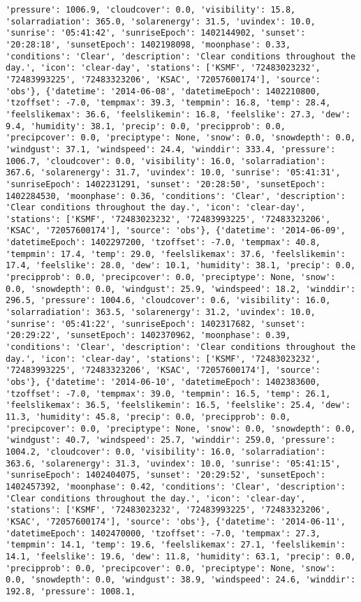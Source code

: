 \documentclass[
  letterpaper,
  DIV=11,
  numbers=noendperiod]{scrartcl}
\begin{document}
\begin{verbatim}
'pressure': 1006.9, 'cloudcover': 0.0, 'visibility': 15.8, 'solarradiation': 365.0, 'solarenergy': 31.5, 'uvindex': 10.0, 'sunrise': '05:41:42', 'sunriseEpoch': 1402144902, 'sunset': '20:28:18', 'sunsetEpoch': 1402198098, 'moonphase': 0.33, 'conditions': 'Clear', 'description': 'Clear conditions throughout the day.', 'icon': 'clear-day', 'stations': ['KSMF', '72483023232', '72483993225', '72483323206', 'KSAC', '72057600174'], 'source': 'obs'}, {'datetime': '2014-06-08', 'datetimeEpoch': 1402210800, 'tzoffset': -7.0, 'tempmax': 39.3, 'tempmin': 16.8, 'temp': 28.4, 'feelslikemax': 36.6, 'feelslikemin': 16.8, 'feelslike': 27.3, 'dew': 9.4, 'humidity': 38.1, 'precip': 0.0, 'precipprob': 0.0, 'precipcover': 0.0, 'preciptype': None, 'snow': 0.0, 'snowdepth': 0.0, 'windgust': 37.1, 'windspeed': 24.4, 'winddir': 333.4, 'pressure': 1006.7, 'cloudcover': 0.0, 'visibility': 16.0, 'solarradiation': 367.6, 'solarenergy': 31.7, 'uvindex': 10.0, 'sunrise': '05:41:31', 'sunriseEpoch': 1402231291, 'sunset': '20:28:50', 'sunsetEpoch': 1402284530, 'moonphase': 0.36, 'conditions': 'Clear', 'description': 'Clear conditions throughout the day.', 'icon': 'clear-day', 'stations': ['KSMF', '72483023232', '72483993225', '72483323206', 'KSAC', '72057600174'], 'source': 'obs'}, {'datetime': '2014-06-09', 'datetimeEpoch': 1402297200, 'tzoffset': -7.0, 'tempmax': 40.8, 'tempmin': 17.4, 'temp': 29.0, 'feelslikemax': 37.6, 'feelslikemin': 17.4, 'feelslike': 28.0, 'dew': 10.1, 'humidity': 38.1, 'precip': 0.0, 'precipprob': 0.0, 'precipcover': 0.0, 'preciptype': None, 'snow': 0.0, 'snowdepth': 0.0, 'windgust': 25.9, 'windspeed': 18.2, 'winddir': 296.5, 'pressure': 1004.6, 'cloudcover': 0.6, 'visibility': 16.0, 'solarradiation': 363.5, 'solarenergy': 31.2, 'uvindex': 10.0, 'sunrise': '05:41:22', 'sunriseEpoch': 1402317682, 'sunset': '20:29:22', 'sunsetEpoch': 1402370962, 'moonphase': 0.39, 'conditions': 'Clear', 'description': 'Clear conditions throughout the day.', 'icon': 'clear-day', 'stations': ['KSMF', '72483023232', '72483993225', '72483323206', 'KSAC', '72057600174'], 'source': 'obs'}, {'datetime': '2014-06-10', 'datetimeEpoch': 1402383600, 'tzoffset': -7.0, 'tempmax': 39.0, 'tempmin': 16.5, 'temp': 26.1, 'feelslikemax': 36.5, 'feelslikemin': 16.5, 'feelslike': 25.4, 'dew': 11.3, 'humidity': 45.8, 'precip': 0.0, 'precipprob': 0.0, 'precipcover': 0.0, 'preciptype': None, 'snow': 0.0, 'snowdepth': 0.0, 'windgust': 40.7, 'windspeed': 25.7, 'winddir': 259.0, 'pressure': 1004.2, 'cloudcover': 0.0, 'visibility': 16.0, 'solarradiation': 363.6, 'solarenergy': 31.3, 'uvindex': 10.0, 'sunrise': '05:41:15', 'sunriseEpoch': 1402404075, 'sunset': '20:29:52', 'sunsetEpoch': 1402457392, 'moonphase': 0.42, 'conditions': 'Clear', 'description': 'Clear conditions throughout the day.', 'icon': 'clear-day', 'stations': ['KSMF', '72483023232', '72483993225', '72483323206', 'KSAC', '72057600174'], 'source': 'obs'}, {'datetime': '2014-06-11', 'datetimeEpoch': 1402470000, 'tzoffset': -7.0, 'tempmax': 27.3, 'tempmin': 14.1, 'temp': 19.6, 'feelslikemax': 27.1, 'feelslikemin': 14.1, 'feelslike': 19.6, 'dew': 11.8, 'humidity': 63.1, 'precip': 0.0, 'precipprob': 0.0, 'precipcover': 0.0, 'preciptype': None, 'snow': 0.0, 'snowdepth': 0.0, 'windgust': 38.9, 'windspeed': 24.6, 'winddir': 192.8, 'pressure': 1008.1, 
\end{verbatim}
\end{document}
